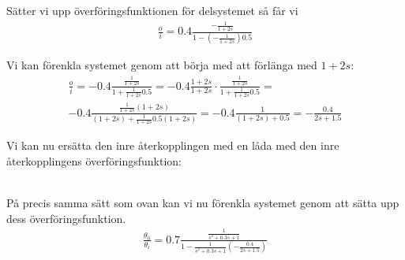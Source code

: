 \documentclass[a4paper]{article}
\begin{document}
Sätter vi upp överföringsfunktionen för delsystemet så får vi
\begin{align*}
  \frac{o}{i} = 0.4 \frac{-\frac{1}{1+2s}}{1-(-\frac{1}{1+2s})0.5}
\end{align*}

Vi kan förenkla systemet genom att börja med att förlänga med $1+2s$:
\begin{align*}
  \frac{o}{i} = -0.4 \frac{\frac{1}{1+2s}}{1+\frac{1}{1+2s}0.5} = -0.4 \frac{1+2s}{1+2s} \cdot \frac{\frac{1}{1+2s}}{1+\frac{1}{1+2s}0.5} =\\
  -0.4 \frac{\frac{1}{1+2s}(1+2s)}{(1+2s) + \frac{1}{1+2s}0.5(1+2s)} = -0.4 \frac{1}{(1+2s) + 0.5} = -\frac{0.4}{2s + 1.5}
\end{align*}


Vi kan nu ersätta den inre återkopplingen med en låda med den inre återkopp\-lingens överföringsfunktion:\\

\\


På precis samma sätt som ovan kan vi nu förenkla systemet genom att sätta upp dess överföringsfunktion.
\begin{align*}
  \frac{\theta_0}{\theta_i} = 0.7 \frac{\frac{1}{s^2 + 0.3s + 1}}{1-\frac{1}{s^2 + 0.3s + 1} (-\frac{0.4}{2s+1.5})}
\end{align*}
\end{document}
